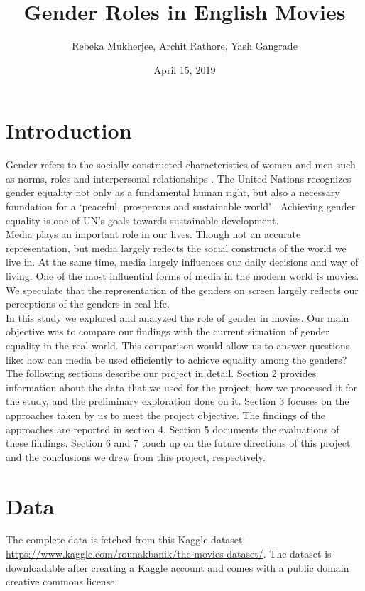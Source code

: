 \documentclass[12pt]{article}
\title{Gender Roles in English Movies}
\author{Rebeka Mukherjee, Archit Rathore, Yash Gangrade}
\date{April 15, 2019}
\begin{document}
\maketitle

\section{Introduction}
Gender refers to the socially constructed characteristics of women and men such as norms, roles and interpersonal relationships \cite{gender_definition}. The United Nations recognizes gender equality not only as a fundamental human right, but also a necessary foundation for a `peaceful, prosperous and sustainable world' \cite{gender_equality}. Achieving gender equality is one of UN's goals towards sustainable development. \\

Media plays an important role in our lives. Though not an accurate representation, but media largely reflects the social constructs of the world we live in. At the same time, media largely influences our daily decisions and way of living. One of the most influential forms of media in the modern world is movies. We speculate that the representation of the genders on screen largely reflects our perceptions of the genders in real life. \\

In this study we explored and analyzed the role of gender in movies. Our main objective was to compare our findings with the current situation of gender equality in the real world. This comparison would allow us to answer questions like: how can media be used efficiently to achieve equality among the genders? \\

The following sections describe our project in detail. Section 2 provides information about the data that we used for the project, how we processed it for the study, and the preliminary exploration done on it. Section 3 focuses on the approaches taken by us to meet the project objective. The findings of the approaches are reported in section 4. Section 5 documents the evaluations of these findings. Section 6 and 7 touch up on the future directions of this project and the conclusions we drew from this project, respectively.

\section{Data}
The complete data is fetched from this Kaggle dataset: \url{https://www.kaggle.com/rounakbanik/the-movies-dataset/}. The dataset is downloadable after creating a Kaggle account and comes with a public domain creative commons license. \\
\end{document}
